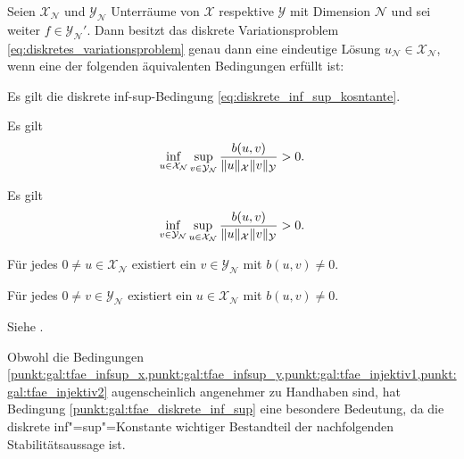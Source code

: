 \documentclass[../main.tex]{subfiles}
\begin{document}
\begin{Satz}
\label{satz:galerkin_wohldefiniertheit}
    Seien $\mathcal X_{\mathcal N}$ und $\mathcal Y_{\mathcal N}$ Unterräume von $\mathcal X$ respektive $\mathcal Y$ mit Dimension $\mathcal N$ und sei weiter $f \in \mathcal Y_{\mathcal N}'$.
    Dann besitzt das diskrete Variationsproblem \cref{eq:diskretes_variationsproblem} genau dann eine eindeutige Lösung $u_{\mathcal N} \in \mathcal X_{\mathcal N}$, wenn eine der folgenden äquivalenten Bedingungen erfüllt ist:
    \begin{thmenumerate}
        \item \label{punkt:gal:tfae_diskrete_inf_sup} Es gilt die diskrete inf-sup-Bedingung \cref{eq:diskrete_inf_sup_kosntante}.
        \item \label{punkt:gal:tfae_infsup_x} Es gilt
            \begin{equation}
                \inf_{u \in \mathcal X_{\mathcal N}} \sup_{v \in \mathcal Y_{\mathcal N}} \frac{b(u, v)}{\lVert u\rVert_{\mathcal X} \lVert v\rVert_{\mathcal Y}} > 0.
            \end{equation}
        \item \label{punkt:gal:tfae_infsup_y} Es gilt
            \begin{equation}
                \inf_{v \in \mathcal Y_{\mathcal N}} \sup_{u \in \mathcal X_{\mathcal N}} \frac{b(u, v)}{\lVert u\rVert_{\mathcal X} \lVert v\rVert_{\mathcal Y}} > 0.
            \end{equation}
        \item \label{punkt:gal:tfae_injektiv1} Für jedes $0 \neq u \in \mathcal X_{\mathcal N}$ existiert ein $v \in \mathcal Y_{\mathcal N}$ mit $b(u, v) \neq 0$.
        \item \label{punkt:gal:tfae_injektiv2} Für jedes $0 \neq v \in \mathcal Y_{\mathcal N}$ existiert ein $u \in \mathcal X_{\mathcal N}$ mit $b(u, v) \neq 0$.
    \end{thmenumerate}

    \begin{Beweis}
        Siehe \cite[Theorem 3.1, Proposition 3.1]{Nochetto:2009il}.
    \end{Beweis}
\end{Satz}

Obwohl die Bedingungen \cref{punkt:gal:tfae_infsup_x,punkt:gal:tfae_infsup_y,punkt:gal:tfae_injektiv1,punkt:gal:tfae_injektiv2} augenscheinlich angenehmer zu Handhaben sind, hat Bedingung \cref{punkt:gal:tfae_diskrete_inf_sup} eine besondere Bedeutung, da die diskrete inf"=sup"=Konstante wichtiger Bestandteil der nachfolgenden Stabilitätsaussage ist.
\end{document}
